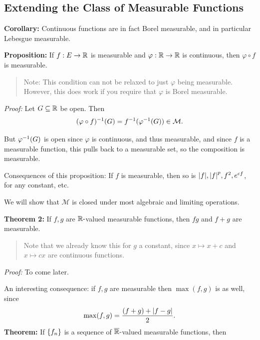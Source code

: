 \hypertarget{extending-the-class-of-measurable-functions}{%
\subsection{Extending the Class of Measurable
Functions}\label{extending-the-class-of-measurable-functions}}

\textbf{Corollary:} Continuous functions are in fact Borel measurable,
and in particular Lebesgue measurable.

\textbf{Proposition:} If \(f: E\to {\mathbb{R}}\) is measurable and
\(\varphi: {\mathbb{R}}\to {\mathbb{R}}\) is continuous, then \(\varphi \circ f\) is
measurable.

\begin{quote}
Note: This condition can not be relaxed to just \(\varphi\) being
measurable. However, this does work if you require that \(\varphi\) is
Borel measurable.
\end{quote}

\emph{Proof:} Let \(G \subseteq {\mathbb{R}}\) be open. Then
\begin{align*}
(\varphi \circ f)^{-1} (G) = f^{-1}(\varphi^{-1}(G)) \in \mathcal M
.\end{align*}

But \(\varphi^{-1}(G)\) is open since \(\varphi\) is continuous, and thus
measurable, and since \(f\) is a measurable function, this pulls back to
a measurable set, so the composition is measurable.

Consequences of this proposition: If \(f\) is measurable, then so is
\({\left\lvert {f} \right\rvert}, {\left\lvert {f} \right\rvert}^p, f^2, e^{cf}\), for any constant, etc.

We will show that \(\mathcal M\) is closed under most algebraic and
limiting operations.

\textbf{Theorem 2:} If \(f, g\) are \({\mathbb{R}}{\hbox{-}}\)valued measurable
functions, then \(fg\) and \(f+g\) are measurable.

\begin{quote}
Note that we already know this for \(g\) a constant, since
\(x \mapsto x+c\) and \(x\mapsto cx\) are continuous functions.
\end{quote}

\emph{Proof:} To come later.

An interesting consequence: if \(f,g\) are measurable then
\(\max(f, g)\) is as well, since
\begin{align*}
\max(f, g) = \frac{(f + g) + {\left\lvert {f-g} \right\rvert}}{2}.
\end{align*} \textbf{Theorem:} If \(\left\{{f_n}\right\}\) is a sequence of
\(\overline{{\mathbb{R}}}{\hbox{-}}\)valued measurable functions, then

